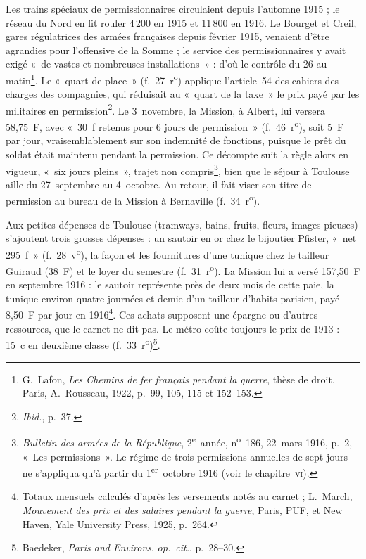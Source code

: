 Les trains spéciaux de permissionnaires circulaient depuis l'automne 1915 ; le réseau du Nord en fit rouler 4\,200 en 1915 et 11\,800 en 1916. Le Bourget et Creil, gares régulatrices des armées françaises depuis février 1915, venaient d'être agrandies pour l'offensive de la Somme ; le service des permissionnaires y avait exigé «~de vastes et nombreuses installations~» : d'où le contrôle du 26 au matin\footnote{G.~Lafon, \textit{Les Chemins de fer français pendant la guerre}, thèse de droit, Paris, A.~Rousseau, 1922, p.~99, 105, 115 et 152--153.}. Le «~quart de place~» (f.~27~r\textsuperscript{o}) applique l'article~54 des cahiers des charges des compagnies, qui réduisait au «~quart de la taxe~» le prix payé par les militaires en permission\footnote{\textit{Ibid.}, p.~37.}. Le 3~novembre, la Mission, à Albert, lui versera 58,75~F, avec «~30~f retenus pour 6 jours de permission~» (f.~46~r\textsuperscript{o}), soit 5~F par jour, vraisemblablement sur son indemnité de fonctions, puisque le prêt du soldat était maintenu pendant la permission. Ce décompte suit la règle alors en vigueur, «~six jours pleins~», trajet non compris\footnote{\textit{Bulletin des armées de la République}, 2\textsuperscript{e}~année, n\textsuperscript{o}~186, 22~mars 1916, p.~2, «~Les permissions~». Le régime de trois permissions annuelles de sept jours ne s'appliqua qu'à partir du 1\textsuperscript{er}~octobre 1916 (voir le chapitre~\textsc{vi}).}, bien que le séjour à Toulouse aille du 27~septembre au 4~octobre. Au retour, il fait viser son titre de permission au bureau de la Mission à Bernaville (f.~34~r\textsuperscript{o}).

Aux petites dépenses de Toulouse (tramways, bains, fruits, fleurs, images pieuses) s'ajoutent trois grosses dépenses : un sautoir en or chez le bijoutier Pfister, «~net 295~f~» (f.~28~v\textsuperscript{o}), la façon et les fournitures d'une tunique chez le tailleur Guiraud (38~F) et le loyer du semestre (f.~31~r\textsuperscript{o}). La Mission lui a versé 157,50~F en septembre 1916 : le sautoir représente près de deux mois de cette paie, la tunique environ quatre journées et demie d'un tailleur d'habits parisien, payé 8,50~F par jour en 1916\footnote{Totaux mensuels calculés d'après les versements notés au carnet ; L.~March, \textit{Mouvement des prix et des salaires pendant la guerre}, Paris, PUF, et New Haven, Yale University Press, 1925, p.~264.}. Ces achats supposent une épargne ou d'autres ressources, que le carnet ne dit pas. Le métro coûte toujours le prix de 1913 : 15~c en deuxième classe (f.~33~r\textsuperscript{o})\footnote{Baedeker, \textit{Paris and Environs}, \textit{op.~cit.}, p.~28--30.}.

